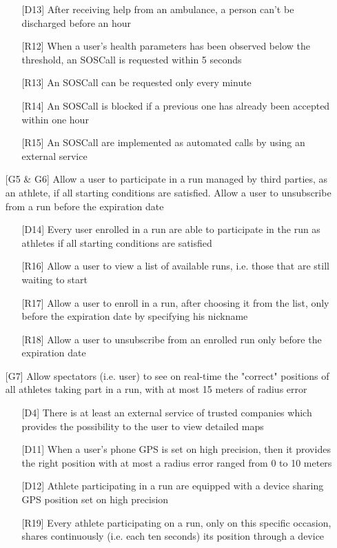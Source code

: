 \begin{itemize}
\begin{itemize}
	\item[{[D13]}] After receiving help from an ambulance, a person can't be discharged before an hour
	\item[{[R12]}] When a user's health parameters has been observed below the threshold, an SOSCall is requested within 5 seconds
	\item[{[R13]}] An SOSCall can be requested only every minute
	\item[{[R14]}] An SOSCall is blocked if a previous one has already been accepted within one hour
	\item[{[R15]}] An SOSCall are implemented as automated calls by using an external service
	\end{itemize}
\item[{[G5 \& G6]}] Allow a user to participate in a run managed by third parties, as an athlete, if all starting conditions are satisfied. Allow a user to unsubscribe from a run before the expiration date
	\begin{itemize}
	\item[{[D14]}] Every user enrolled in a run are able to participate in the run as athletes if all starting conditions are satisfied
	\item[{[R16]}] Allow a user to view a list of available runs, i.e. those that are still waiting to start 
	\item[{[R17]}] Allow a user to enroll in a run, after choosing it from the list, only before the expiration date by specifying his nickname
	\item[{[R18]}] Allow a user to unsubscribe from an enrolled run only before the expiration date
	\end{itemize}
\item[{[G7]}] Allow spectators (i.e. user) to see on real-time the "correct" positions of all athletes taking part in a run, with at most 15 meters of radius error
	\begin{itemize}
	\item[{[D4]}] There is at least an external service of trusted companies which provides the possibility to the user to view detailed maps
	\item[{[D11]}] When a user's phone GPS is set on high precision, then it provides the right position with at most a radius error ranged from 0 to 10 meters
	\item[{[D12]}] Athlete participating in a run are equipped with a device sharing GPS position set on high precision
	\item[{[R19]}] Every athlete participating on a run, only on this specific occasion, shares continuously (i.e. each ten seconds) its position through a device

\end{itemize}
\end{itemize}
